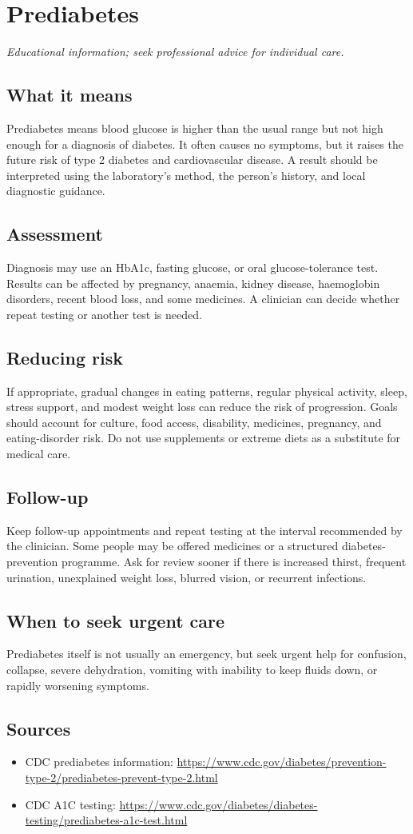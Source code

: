 \chapter{Prediabetes}

\medskip
\noindent\textit{Educational information; seek professional advice for individual care.}

\section*{What it means}
Prediabetes means blood glucose is higher than the usual range but not high enough for a diagnosis of diabetes. It often causes no symptoms, but it raises the future risk of type 2 diabetes and cardiovascular disease. A result should be interpreted using the laboratory’s method, the person’s history, and local diagnostic guidance.

\section*{Assessment}
Diagnosis may use an HbA1c, fasting glucose, or oral glucose-tolerance test. Results can be affected by pregnancy, anaemia, kidney disease, haemoglobin disorders, recent blood loss, and some medicines. A clinician can decide whether repeat testing or another test is needed.

\section*{Reducing risk}
If appropriate, gradual changes in eating patterns, regular physical activity, sleep, stress support, and modest weight loss can reduce the risk of progression. Goals should account for culture, food access, disability, medicines, pregnancy, and eating-disorder risk. Do not use supplements or extreme diets as a substitute for medical care.

\section*{Follow-up}
Keep follow-up appointments and repeat testing at the interval recommended by the clinician. Some people may be offered medicines or a structured diabetes-prevention programme. Ask for review sooner if there is increased thirst, frequent urination, unexplained weight loss, blurred vision, or recurrent infections.

\section*{When to seek urgent care}
Prediabetes itself is not usually an emergency, but seek urgent help for confusion, collapse, severe dehydration, vomiting with inability to keep fluids down, or rapidly worsening symptoms.

\section*{Sources}
\begin{itemize}
\item CDC prediabetes information: \url{https://www.cdc.gov/diabetes/prevention-type-2/prediabetes-prevent-type-2.html}
\item CDC A1C testing: \url{https://www.cdc.gov/diabetes/diabetes-testing/prediabetes-a1c-test.html}
\end{itemize}
